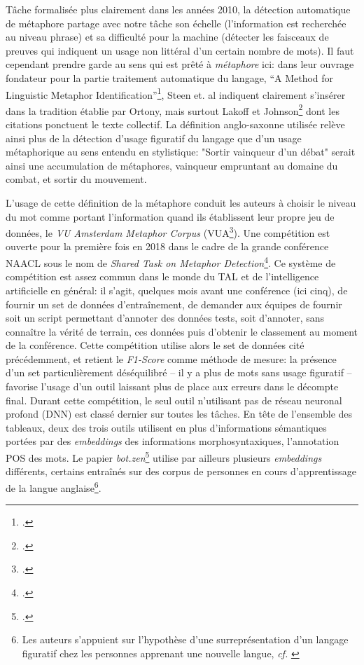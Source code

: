 Tâche formalisée plus clairement dans les années 2010, la détection automatique de métaphore partage avec notre tâche son échelle (l'information est recherchée au niveau phrase) et sa difficulté pour la machine (détecter les faisceaux de preuves qui indiquent un usage non littéral d'un certain nombre de mots). Il faut cependant prendre garde au sens qui est prêté à \textit{métaphore} ici: dans leur ouvrage fondateur pour la partie traitement automatique du langage, \enquote{A Method for Linguistic Metaphor Identification}\footcite{steen_method_2010}, Steen et. al indiquent clairement s'insérer dans la tradition établie par Ortony, mais surtout Lakoff et Johnson\footcite{lakoff_metaphors_2003} dont les citations ponctuent le texte collectif. La définition anglo-saxonne utilisée relève ainsi plus de la détection d'usage figuratif du langage que d'un usage métaphorique au sens entendu en stylistique: "Sortir vainqueur d'un débat" serait ainsi une accumulation de métaphores, vainqueur empruntant au domaine du combat, et sortir du mouvement.

L'usage de cette définition de la métaphore conduit les auteurs à choisir le niveau du mot comme portant l'information quand ils établissent leur propre jeu de données, le \textit{VU Amsterdam Metaphor Corpus} (VUA\footcite{steen_method_2010}). Une compétition est ouverte pour la première fois en 2018 dans le cadre de la grande conférence NAACL sous le nom de \textit{Shared Task on Metaphor Detection}\footcite{leong_report_2018}. Ce système de compétition est assez commun dans le monde du TAL et de l'intelligence artificielle en général: il s'agit, quelques mois avant une conférence (ici cinq), de fournir un set de données d'entraînement, de demander aux équipes de fournir soit un script permettant d'annoter des données tests, soit d'annoter, sans connaître la vérité de terrain, ces données puis d'obtenir le classement au moment de la conférence. Cette compétition utilise alors le set de données cité précédemment, et retient le \textit{F1-Score} comme méthode de mesure: la présence d'un set particulièrement déséquilibré -- il y a plus de mots sans usage figuratif -- favorise l'usage d'un outil laissant plus de place aux erreurs dans le décompte final. Durant cette compétition, le seul outil n'utilisant pas de réseau neuronal profond (DNN) est classé dernier sur toutes les tâches. En tête de l'ensemble des tableaux, deux des trois outils utilisent en plus d'informations sémantiques portées par des \textit{embeddings} des informations morphosyntaxiques, l'annotation POS des mots. Le papier \textit{bot.zen}\footcite{stemle_using_2018} utilise par ailleurs plusieurs \textit{embeddings} différents, certains entraînés sur des corpus de personnes en cours d'apprentissage de la langue anglaise\footnote{Les auteurs s'appuient sur l'hypothèse d'une surreprésentation d'un langage figuratif chez les personnes apprenant une nouvelle langue, \textit{cf.} \cite{klebanov_argumentation-relevant_2013}}. 

